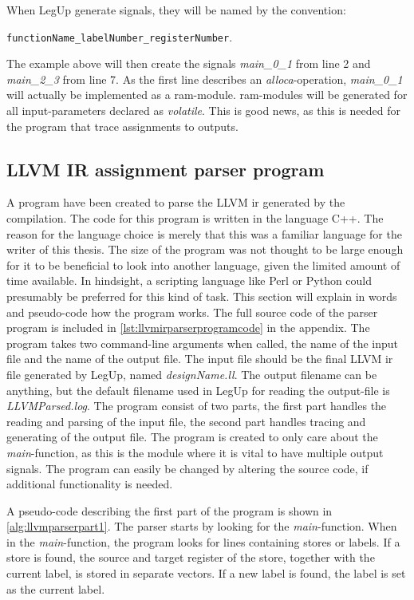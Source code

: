 When LegUp generate signals, they will be named by the convention:

\verb!functionName_labelNumber_registerNumber!. 

The example above will then create the signals \textit{main\_0\_1} from line 2 and \textit{main\_2\_3} from line 7. As the first line describes an \textit{alloca}-operation, \textit{main\_0\_1} will actually be implemented as a \gls{ram}-module. \gls{ram}-modules will be generated for all input-parameters declared as \textit{volatile}. This is good news, as this is needed for the program that trace assignments to outputs.
\subsection{\label{subsec:llvmirparserprogram}LLVM IR assignment parser program}
A program have been created to parse the LLVM \gls{ir} generated by the compilation. The code for this program is written in the language C++. The reason for the language choice is merely that this was a familiar language for the writer of this thesis. The size of the program was not thought to be large enough for it to be beneficial to look into another language, given the limited amount of time available. In hindsight, a scripting language like Perl or Python could presumably be preferred for this kind of task. This section will explain in words and pseudo-code how the program works. The full source code of the parser program is included in \ref{lst:llvmirparserprogramcode} in the appendix. The program takes two command-line arguments when called, the name of the input file and the name of the output file. The input file should be the final LLVM \gls{ir} file generated by LegUp, named \textit{designName.ll}. The output filename can be anything, but the default filename used in LegUp for reading the output-file is \textit{LLVMParsed.log}. The program consist of two parts, the first part handles the reading and parsing of the input file, the second part handles tracing and generating of the output file. The program is created to only care about the \textit{main}-function, as this is the module where it is vital to have multiple output signals. The program can easily be changed by altering the source code, if additional functionality is needed.

A pseudo-code describing the first part of the program is shown in \cref{alg:llvmparserpart1}. The parser starts by looking for the \textit{main}-function. When in the \textit{main}-function, the program looks for lines containing stores or labels. If a store is found, the source and target register of the store, together with the current label, is stored in separate vectors. If a new label is found, the label is set as the current label.

